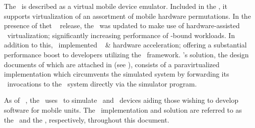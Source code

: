 The \dvttermandroidemulator\ is described as a virtual mobile device emulator. Included in the \dvttermandroidsdk , it supports virtualization of an assortment of mobile hardware permutations.
In the presence of thet \dvttermandroid\  release, the \dvttermandroidsdk\ was updated to make use of hardware-assisted \dvttermxeightysix\ virtualization; significantly increasing performance of \dvttermcpu -bound workloads.
In addition to this, \dvttermgoogle\ implemented \dvttermopengles\  \&  hardware acceleration; offering a substantial performance boost to developers utilizing the \dvttermopengles\ framework.
\dvttermgoogle 's solution, the design documents of which are attached in  (see ), consists of a paravirtualized implementation which circumvents the simulated system by forwarding its \dvttermopengles\ invocations to the \dvttermhost\ system directly via the simulator program.

As of \dvttermandroid\ , the \dvttermandroidemulator\ uses \dvttermqemu\ to simulate \dvttermarm\ and \dvttermxeightysix\ devices aiding those wishing to develop software for mobile units.
The \dvttermandroidemulator\ implementation and solution are referred to as the \dvttermreferenceimplementation\ and the \dvttermreferencesolution , respectively, throughout this document.

